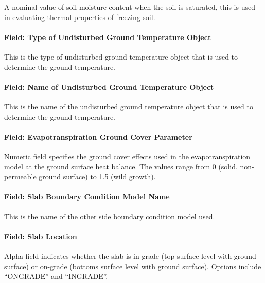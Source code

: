 A nominal value of soil moisture content when the soil is saturated, this is used in evaluating thermal properties of freezing soil.

\paragraph{Field: Type of Undisturbed Ground Temperature Object}\label{field-type-of-undisturbed-ground-temperature-object-000}

This is the type of undisturbed ground temperature object that is used to determine the ground temperature.

\paragraph{Field: Name of Undisturbed Ground Temperature Object}\label{field-name-of-undisturbed-ground-temperature-object-000}

This is the name of the undisturbed ground temperature object that is used to determine the ground temperature.

\paragraph{Field: Evapotranspiration Ground Cover Parameter}\label{field-evapotranspiration-ground-cover-parameter-1}

Numeric field specifies the ground cover effects used in the evapotranspiration model at the ground surface heat balance. The values range from 0 (solid, non-permeable ground surface) to 1.5 (wild growth).

\paragraph{Field: Slab Boundary Condition Model Name}\label{field-slab-boundary-condition-model-name}

This is the name of the other side boundary condition model used.

\paragraph{Field: Slab Location}\label{field-slab-location}

Alpha field indicates whether the slab is in-grade (top surface level with ground surface) or on-grade (bottoms surface level with ground surface). Options include ``ONGRADE'' and ``INGRADE''.

